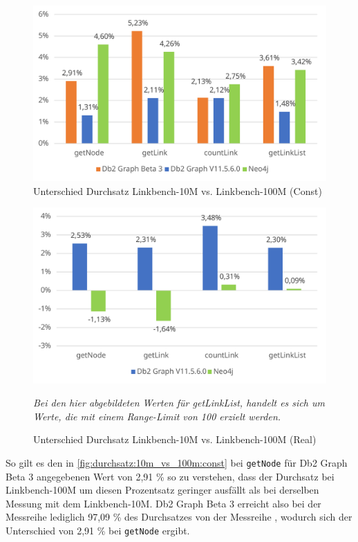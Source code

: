 \begin{figure}[!ht]
    \centering
    \includegraphics[width=\textwidth]{images/diagramme/difference_durchsatz_const_10m_vs_100m.pdf}
    \caption{Unterschied Durchsatz Linkbench-10M vs. Linkbench-100M (Const)}
    \label{fig:durchsatz:10m_vs_100m:const}
\end{figure}

\begin{figure}[!ht]
    \centering
    \includegraphics[width=\textwidth]{images/diagramme/difference_durchsatz_real_10m_vs_100m.pdf}
    \caption{Unterschied Durchsatz Linkbench-10M vs. Linkbench-100M (Real)}
    \label{fig:durchsatz:10m_vs_100m:real}
    \vspace{1em}
    \textit{Bei den hier abgebildeten Werten für getLinkList, handelt es sich um Werte, die mit einem Range-Limit von 100 erzielt werden.}
\end{figure}

So gilt es den in \autoref{fig:durchsatz:10m_vs_100m:const} bei \texttt{getNode} für Db2 Graph Beta 3 angegebenen Wert von 2,91 \% so zu verstehen, dass der Durchsatz bei Linkbench-100M um diesen Prozentsatz geringer ausfällt als bei derselben Messung mit dem Linkbench-10M. Db2 Graph Beta 3 erreicht also bei der Messreihe  lediglich 97,09 \% des Durchsatzes von der Messreihe , wodurch sich der Unterschied von 2,91 \% bei \texttt{getNode} ergibt.

